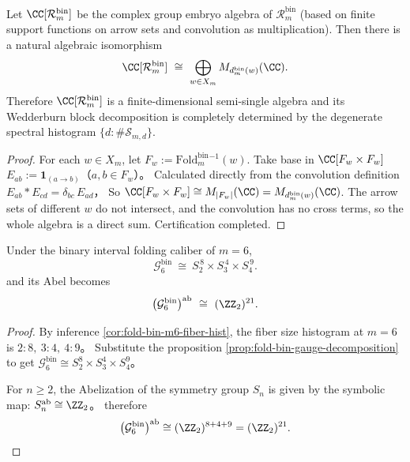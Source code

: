 \begin{proposition}\label{prop:fold-bin-groupoid-algebra-wedderburn}
Let \(\CC[\mathcal{R}^{\mathrm{bin}}_m]\) be the complex group embryo algebra of \(\mathcal{R}^{\mathrm{bin}}_m\) (based on finite support functions on arrow sets and convolution as multiplication).
Then there is a natural algebraic isomorphism
\[
\CC[\mathcal{R}^{\mathrm{bin}}_m]\ \cong\ \bigoplus_{w\in X_m} M_{d^{\mathrm{bin}}_m(w)}(\CC).
\]
Therefore \(\CC[\mathcal{R}^{\mathrm{bin}}_m]\) is a finite-dimensional semi-single algebra and its Wedderburn block decomposition is completely determined by the degenerate spectral histogram \(\{d:\#\mathcal{S}_{m,d}\}\).
\end{proposition}
\begin{proof}
For each \(w\in X_m\), let \(F_w:=\mathrm{Fold}^{\mathrm{bin}}_m{}^{-1}(w)\).
Take base in \(\CC[F_w\times F_w]\)
\(
E_{ab}:=\mathbf{1}_{(a\to b)}
\)（\(a,b\in F_w\)）。
Calculated directly from the convolution definition
\(
E_{ab}*E_{cd}=\delta_{bc}\,E_{ad}
\)，
So \(\CC[F_w\times F_w]\cong M_{|F_w|}(\CC)=M_{d^{\mathrm{bin}}_m(w)}(\CC)\).
The arrow sets of different \(w\) do not intersect, and the convolution has no cross terms, so the whole algebra is a direct sum. Certification completed.
\end{proof}

\begin{corollary}[\texorpdfstring{$m=6$}{m=6} gauge group and \texorpdfstring{$(\ZZ_2)^{21}$}{(Z2)^21} charge grid]\label{cor:fold-bin-gauge-m6}
Under the binary interval folding caliber of \(m=6\),
\[
\mathcal{G}^{\mathrm{bin}}_6
\ \cong\
S_{2}^{\,8}\times S_{3}^{\,4}\times S_{4}^{\,9}.
\]
and its Abel becomes
\[
\bigl(\mathcal{G}^{\mathrm{bin}}_6\bigr)^{\mathrm{ab}}
\ \cong\
(\ZZ_2)^{21}.
\]
\end{corollary}
\begin{proof}
By inference \ref{cor:fold-bin-m6-fiber-hist}, the fiber size histogram at \(m=6\) is
\(
2:8,\ 3:4,\ 4:9
\)。
Substitute the proposition \ref{prop:fold-bin-gauge-decomposition} to get
\(
\mathcal{G}^{\mathrm{bin}}_6\cong S_2^{8}\times S_3^{4}\times S_4^{9}
\)。
\par
For \(n\ge 2\), the Abelization of the symmetry group \(S_n\) is given by the symbolic map:
\(
S_n^{\mathrm{ab}}\cong \ZZ_2
\)。
therefore
\[
\bigl(\mathcal{G}^{\mathrm{bin}}_6\bigr)^{\mathrm{ab}}
\cong (\ZZ_2)^{8+4+9}=(\ZZ_2)^{21}.
\]
\end{proof}

